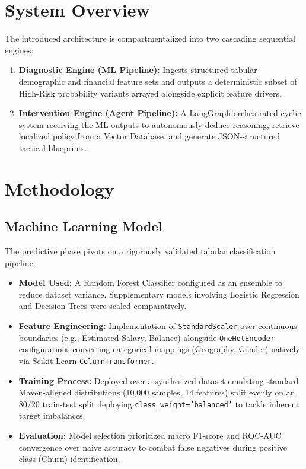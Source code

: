 \documentclass[conference, a4paper]{IEEEtran}
\begin{document}
\section{System Overview}
The introduced architecture is compartmentalized into two cascading sequential engines:
\begin{enumerate}
    \item \textbf{Diagnostic Engine (ML Pipeline):} Ingests structured tabular demographic and financial feature sets and outputs a deterministic subset of High-Risk probability variants arrayed alongside explicit feature drivers.
    \item \textbf{Intervention Engine (Agent Pipeline):} A LangGraph orchestrated cyclic system receiving the ML outputs to autonomously deduce reasoning, retrieve localized policy from a Vector Database, and generate JSON-structured tactical blueprints.
\end{enumerate}

\section{Methodology}

\subsection{Machine Learning Model}
The predictive phase pivots on a rigorously validated tabular classification pipeline. 
\begin{itemize}
    \item \textbf{Model Used:} A Random Forest Classifier configured as an ensemble to reduce dataset variance. Supplementary models involving Logistic Regression and Decision Trees were scaled comparatively. 
    \item \textbf{Feature Engineering:} Implementation of \texttt{StandardScaler} over continuous boundaries (e.g., Estimated Salary, Balance) alongside \texttt{OneHotEncoder} configurations converting categorical mappings (Geography, Gender) natively via Scikit-Learn \texttt{ColumnTransformer}.
    \item \textbf{Training Process:} Deployed over a synthesized dataset emulating standard Maven-aligned distributions (10,000 samples, 14 features) split evenly on an 80/20 train-test split deploying \texttt{class\_weight='balanced'} to tackle inherent target imbalances.
    \item \textbf{Evaluation:} Model selection prioritized macro F1-score and ROC-AUC convergence over naive accuracy to combat false negatives during positive class (Churn) identification.
\end{itemize}
\end{document}
